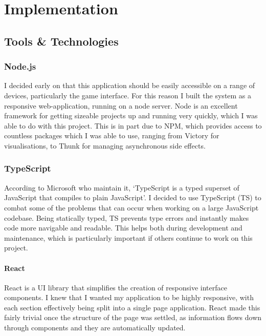 \chapter{Implementation}

\section{Tools \& Technologies}

\subsection{Node.js}
I decided early on that this application should be easily accessible on a range of devices, particularly the game interface. For this reason I built the system as a responsive web-application, running on a node server. Node\cite{Node} is an excellent framework for getting sizeable projects up and running very quickly, which I was able to do with this project. This is in part due to NPM\cite{npm}, which provides access to countless packages which I was able to use, ranging from Victory\cite{Victory} for visualisations, to Thunk\cite{Thunk} for managing asynchronous side effects.

\subsection{TypeScript}
According to Microsoft who maintain it, `TypeScript is a typed superset of JavaScript that compiles to plain JavaScript'\cite{Typescript}. 
I decided to use TypeScript (TS) to combat some of the problems that can occur when working on a large JavaScript codebase. 
Being statically typed, TS prevents type errors and instantly makes code more navigable and readable. 
This helps both during development and maintenance, which is particularly important if others continue to work on this project.

\subsubsection{React}
React\cite{React} is a UI library that simplifies the creation of responsive interface components. I knew that I wanted my application to be highly responsive, with each section effectively being split into a single page application. React made this fairly trivial once the structure of the page was settled, as information flows down through components and they are automatically updated.

